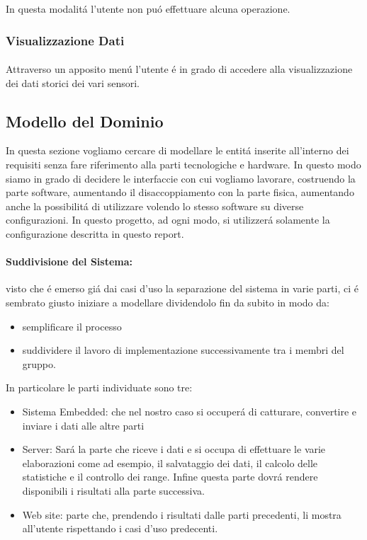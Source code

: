 In questa modalit\'a l'utente non pu\'o effettuare alcuna operazione.

\subsubsection{Visualizzazione Dati}

\paragraph{} Attraverso un apposito men\'u l'utente \'e in grado di accedere alla visualizzazione dei dati storici dei vari sensori.

\newpage

\subsection{Modello del Dominio}

In questa sezione vogliamo cercare di modellare le entit\'a inserite all'interno dei requisiti senza fare riferimento alla parti tecnologiche e hardware. In questo modo siamo in grado di decidere le interfaccie con cui vogliamo lavorare, costruendo la parte software, aumentando il disaccoppiamento con la parte fisica, aumentando anche la possibilit\'a di utilizzare volendo lo stesso software su diverse configurazioni. In questo progetto, ad ogni modo, si utilizzer\'a solamente la configurazione descritta in questo report.

\paragraph{Suddivisione del Sistema:} visto che \'e emerso gi\'a dai casi d'uso la separazione del sistema in varie parti, ci \'e sembrato giusto iniziare a modellare dividendolo fin da subito in modo da:
\begin{itemize}
  \item semplificare il processo
  \item suddividere il lavoro di implementazione successivamente tra i membri del gruppo.
\end{itemize}

In particolare le parti individuate sono tre:

\begin{itemize}
  \item Sistema Embedded: che nel nostro caso si occuper\'a di catturare, convertire e inviare i dati alle altre parti
  \item Server: Sar\'a la parte che riceve i dati e si occupa di effettuare le varie elaborazioni come ad esempio, il salvataggio dei dati, il calcolo delle statistiche e il controllo dei range. Infine questa parte dovr\'a rendere disponibili i risultati alla parte successiva.
  \item Web site: parte che, prendendo i risultati dalle parti precedenti, li mostra all'utente rispettando i casi d'uso predecenti.
\end{itemize}

